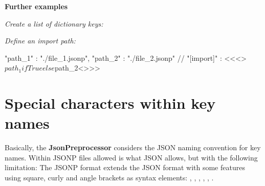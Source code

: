 


\vspace{2ex}

\textbf{Further examples}

\textit{Create a list of dictionary keys:}


\textit{Define an import path:}

\begin{pythoncode}
"path_1" : "./file_1.jsonp",
"path_2" : "./file_2.jsonp"
//
"[import]" : <\textless{}\textless{}>${path_1} if True else ${path_2}<\textgreater{}\textgreater{}>
\end{pythoncode}




\newpage

\section{Special characters within key names}

Basically, the \textbf{JsonPreprocessor} considers the JSON naming convention for key names. Within JSONP files allowed is what JSON allows,
but with the following limitation: The JSONP format extends the JSON format with some features using square, curly and angle brackets as syntax elements:
\pcode{[}, \pcode{]}, \pcode{\{}, \pcode{\}}, \pcode{<}, \pcode{>}.

